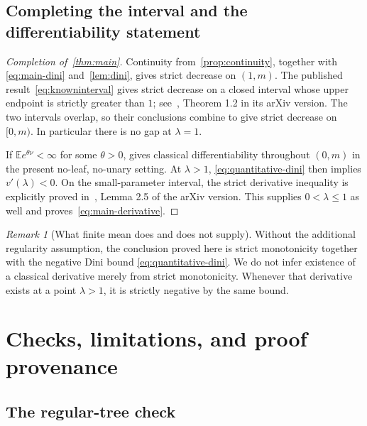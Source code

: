 \documentclass[11pt,a4paper]{article}
\numberwithin{equation}{section}
\theoremstyle{plain}
\theoremstyle{definition}
\theoremstyle{remark}
\newtheorem{remark}[remark]{Remark}
\newcommand{\E}{\mathbb E}
\begin{document}
\subsection{Completing the interval and the differentiability statement}

\begin{proof}[Completion of~\cref{thm:main}]
Continuity from~\cref{prop:continuity}, together with
\eqref{eq:main-dini} and~\cref{lem:dini}, gives strict decrease on $(1,m)$.
The published result~\eqref{eq:knowninterval} gives strict decrease on a
closed interval whose upper endpoint is strictly greater than $1$;
see~\cite{SWX25}, Theorem 1.2 in its arXiv version.  The two intervals
overlap, so their conclusions combine to give strict decrease on
$[0,m)$.  In particular there is no gap at $\lambda=1$.

If $\E e^{\theta\nu}<\infty$ for some $\theta>0$,
\cite[Theorem 1.1]{BT20} gives classical differentiability throughout
$(0,m)$ in the present no-leaf, no-unary setting.  At $\lambda>1$,
\eqref{eq:quantitative-dini} then implies $v'(\lambda)<0$.  On the
small-parameter interval, the strict derivative inequality is explicitly
proved in~\cite{SWX25}, Lemma 2.5 of the arXiv version.  This supplies
$0<\lambda\le1$ as well and proves~\eqref{eq:main-derivative}.
\end{proof}

\begin{remark}[What finite mean does and does not supply]
Without the additional regularity assumption, the conclusion proved
here is strict monotonicity together with the negative Dini bound
\eqref{eq:quantitative-dini}.  We do not infer existence of a classical
derivative merely from strict monotonicity.  Whenever that derivative
exists at a point $\lambda>1$, it is strictly negative by the same bound.
\end{remark}

\section{Checks, limitations, and proof provenance}\label{sec:scope}

\subsection{The regular-tree check}
\end{document}
